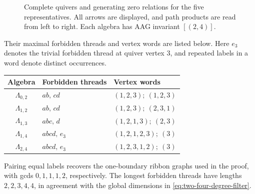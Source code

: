 \documentclass[11pt]{amsart}
\theoremstyle{definition}
\theoremstyle{plain}
\theoremstyle{definition}
\theoremstyle{definition}
\begin{document}
\begin{figure}[!htbp]
\caption{Complete quivers and generating zero relations for the five
representatives.  All arrows are displayed, and path products are read
from left to right.  Each algebra has AAG invariant $[(2,4)]$.}
\label{fig:two-four-quivers}
\end{figure}
Their maximal forbidden threads and vertex words are
listed below.  Here $e_3$ denotes the trivial forbidden thread at
quiver vertex $3$, and repeated labels in a word denote distinct
occurrences.
\begin{center}
\small
\renewcommand{\arraystretch}{1.15}
\begin{tabular}{@{}cll@{}}
  Algebra & Forbidden threads & Vertex words\\ \hline
  $\Lambda_{0,2}$ & $ab,\,cd$
    & $(1,2,3);\ (1,2,3)$\\
  $\Lambda_{1,2}$ & $ab,\,cd$
    & $(1,2,3);\ (2,3,1)$\\
  $\Lambda_{1,3}$ & $abc,\,d$
    & $(1,2,1,3);\ (2,3)$\\
  $\Lambda_{1,4}$ & $abcd,\,e_3$
    & $(1,2,1,2,3);\ (3)$\\
  $\Lambda_{2,4}$ & $abcd,\,e_3$
    & $(1,2,3,1,2);\ (3)$
\end{tabular}
\end{center}
Pairing equal labels recovers the one-boundary ribbon graphs
used in the proof, with gcds $0,1,1,1,2$, respectively.
The longest forbidden threads have lengths $2,2,3,4,4$,
in agreement with the global dimensions in
\eqref{eq:two-four-degree-filter}.
\end{document}
